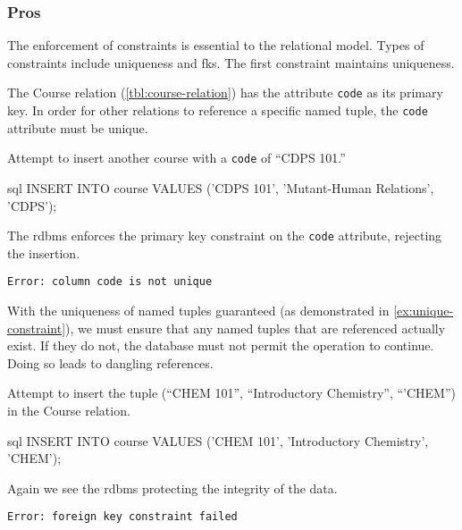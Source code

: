 		\subsubsection{Pros}
			The enforcement of constraints is essential to the relational model.  Types of constraints include uniqueness and \glspl{fk}.  The first constraint maintains uniqueness.
			
			The Course relation (\cref{tbl:course-relation}) has the attribute \texttt{code} as its primary key.	In order for other relations to reference a specific named tuple, the \texttt{code} attribute must be unique.
			
			\begin{ex}
			\label{ex:unique-constraint}
				Attempt to insert another course with a \texttt{code} of ``CDPS 101.''
				
				\begin{singlespaced}
					\begin{pygments}{sql}
INSERT INTO course
VALUES      ('CDPS 101',
             'Mutant-Human Relations',
             'CDPS');
					\end{pygments}
				\end{singlespaced}
				
				The \gls{rdbms} enforces the primary key constraint on the \texttt{code} attribute, rejecting the insertion.
				
				\begin{verbatim}
Error: column code is not unique
				\end{verbatim}
			\end{ex}
			
			With the uniqueness of named tuples guaranteed (as demonstrated in \cref{ex:unique-constraint}), we must ensure that any named tuples that are referenced actually exist.  If they do not, the database must not permit the operation to continue.  Doing so leads to dangling references.
			
			\begin{ex}
				Attempt to insert the tuple (``CHEM 101'', ``Introductory Chemistry'', ``'CHEM'') in the Course relation.
				
				\begin{singlespaced}
					\begin{pygments}{sql}
INSERT INTO course
VALUES      ('CHEM 101',
             'Introductory Chemistry',
             'CHEM');
					\end{pygments}
				\end{singlespaced}
				
				Again we see the \gls{rdbms} protecting the integrity of the data.
				
				\begin{verbatim}
Error: foreign key constraint failed
				\end{verbatim}
			\end{ex}
			
